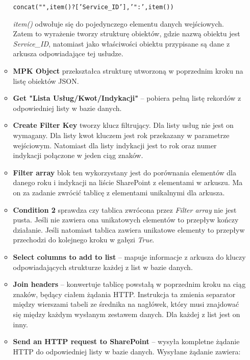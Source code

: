 \begin{enumerate}
\begin{itemize}[label=\textasteriskcentered]
        \begin{center}
        \texttt{concat("",item()?['Service\_ID'],'":',item())}
        \end{center}
        
        \emph{item()} odwołuje się do pojedynczego elementu danych wejściowych. Zatem to wyrażenie tworzy strukturę obiektów, gdzie nazwą obiektu jest \emph{Service\_ID}, natomiast jako właściwości obiektu przypisane są dane z arkusza odpowiadające tej usłudze.
        \item \textbf{MPK Object} przekształca strukturę utworzoną w poprzednim kroku na listę obiektów JSON.
    \end{itemize}

    \begin{itemize}
    \item\textbf{Get "Lista Usług/Kwot/Indykacji"} -- pobiera pełną listę rekordów z odpowiedniej listy w bazie danych.
    \item \textbf{Create Filter Key} tworzy klucz filtrujący. Dla listy usług nie jest on wymagany. Dla listy kwot kluczem jest rok przekazany w parametrze wejściowym. Natomiast dla listy indykacji jest to rok oraz numer indykacji połączone w jeden ciąg znaków.
    \item \textbf{Filter array} blok ten wykorzystany jest do porównania elementów dla danego roku i indykacji na liście SharePoint z elementami w arkuszu. Ma on za zadanie zwrócić tablicę z elementami unikalnymi dla arkusza.
    \item \textbf{Condition 2} sprawdza czy tablica zwrócona przez \emph{Filter array} nie jest pusta. Jeśli nie zawiera ona unikatowych elementów to przepływ kończy działanie.
    Jeśli natomiast tablica zawiera unikatowe elementy to przepływ przechodzi do kolejnego kroku w gałęzi \emph{True}.
    \item \textbf{Select columns to add to list} -- mapuje informacje z arkusza do kluczy odpowiadających strukturze każdej z list w bazie danych.
    \item \textbf{Join headers} -- konwertuje tablicę powstałą w poprzednim kroku na ciąg znaków, będący ciałem żądania HTTP. Instrukcja ta zmienia separator między wierszami tabeli ze średnika na nagłówek, który musi znajdować się między każdym wysłanym zestawem danych. Dla każdej z list jest on inny.
    \item \textbf{Send an HTTP request to SharePoint} -- wysyła kompletne żądanie HTTP do odpowiedniej listy w bazie danych. Wysyłane żądanie zawiera:
    \begin{itemize}

\end{itemize}
\end{itemize}
\end{enumerate}
